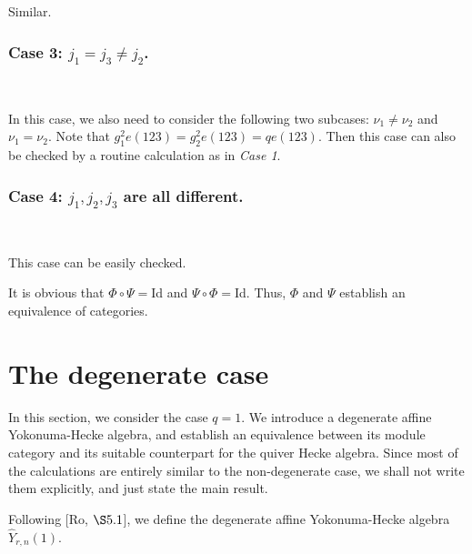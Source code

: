 \documentclass[11pt, reqno]{amsart} \textwidth=14.9cm \oddsidemargin=1cm \evensidemargin=1cm
\theoremstyle{definition}
\numberwithin{equation}{section}
\begin{document}
\vspace{0.3cm}\noindent Similar.
\subsubsection*{Case 3: $j_1=j_3\neq j_2$.}

\

\vspace{0.3cm}\noindent In this case, we also need to consider the following two subcases: $\nu_1\neq \nu_2$ and $\nu_1=\nu_2.$ Note that $g_{1}^{2}e(123)=g_{2}^{2}e(123)=qe(123).$ Then this case can also be checked by a routine calculation as in \emph{Case 1}.

\subsubsection*{Case 4: $j_1, j_2, j_3$ are all different.}

\

\vspace{0.3cm}\noindent This case can be easily checked.

It is obvious that $\Phi\circ\Psi=$Id and $\Psi\circ\Phi=$Id. Thus, $\Phi$ and $\Psi$ establish an equivalence of categories.

\section{The degenerate case}

In this section, we consider the case $q=1.$ We introduce a degenerate affine Yokonuma-Hecke algebra, and establish an equivalence between its module category and its suitable counterpart for the quiver Hecke algebra. Since most of the calculations are entirely similar to the non-degenerate case, we shall not write them explicitly, and just state the main result.

Following [Ro, $\S5.1$], we define the degenerate affine Yokonuma-Hecke algebra $\widehat{Y}_{r,n}(1).$
\end{document}
